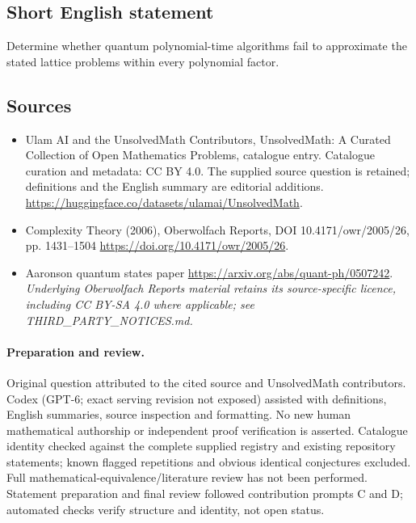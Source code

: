 \documentclass[11pt]{article}
\begin{document}
\subsection{Short English statement}
Determine whether quantum polynomial-time algorithms fail to approximate the stated lattice problems within every polynomial factor.
\subsection{Sources}
\begin{itemize}
\item[\hypertarget{source:statement:1}{S1}] Ulam AI and the UnsolvedMath Contributors, UnsolvedMath: A Curated Collection of Open Mathematics Problems, catalogue entry. Catalogue curation and metadata: CC BY 4.0. The supplied source question is retained; definitions and the English summary are editorial additions.
\url{https://huggingface.co/datasets/ulamai/UnsolvedMath}.
\item[\hypertarget{source:statement:2}{S2}] Complexity Theory (2006), Oberwolfach Reports, DOI 10.4171/owr/2005/26, pp. 1431--1504
\url{https://doi.org/10.4171/owr/2005/26}.
\item[\hypertarget{source:statement:3}{S3}] Aaronson quantum states paper
\url{https://arxiv.org/abs/quant-ph/0507242}.
\textit{Underlying Oberwolfach Reports material retains its source-specific licence, including CC BY-SA 4.0 where applicable; see THIRD\_PARTY\_NOTICES.md.}
\end{itemize}
\paragraph{Preparation and review.}
Original question attributed to the cited source and UnsolvedMath contributors. Codex (GPT-6; exact serving revision not exposed) assisted with definitions, English summaries, source inspection and formatting. No new human mathematical authorship or independent proof verification is asserted. Catalogue identity checked against the complete supplied registry and existing repository statements; known flagged repetitions and obvious identical conjectures excluded. Full mathematical-equivalence/literature review has not been performed. Statement preparation and final review followed contribution prompts C and D; automated checks verify structure and identity, not open status.
\label{end:statement}
\end{document}

